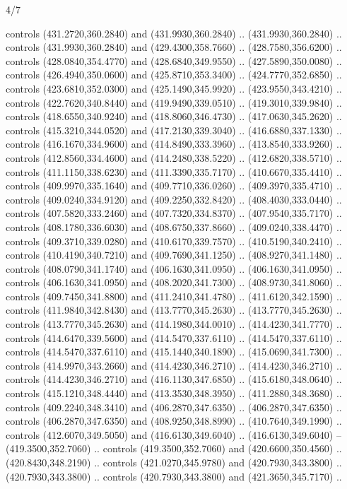 \begin{flagdescription}{4/7}
\begin{scope}[shift={(0.5\flaglength,0.5\flagwidth)},scale=\flagwidth*\stretchfactor/820]
\begin{scope}[scale=1.87,xshift=-138mm,yshift=75mm]
\begin{scope}[y=0.8pt, x=0.8pt, yscale=-1, xscale=1]
\begin{scope}[fill=c9ca168]
  controls (431.2720,360.2840) and (431.9930,360.2840) .. (431.9930,360.2840) ..
  controls (431.9930,360.2840) and (429.4300,358.7660) .. (428.7580,356.6200) ..
  controls (428.0840,354.4770) and (428.6840,349.9550) .. (427.5890,350.0080) ..
  controls (426.4940,350.0600) and (425.8710,353.3400) .. (424.7770,352.6850) ..
  controls (423.6810,352.0300) and (425.1490,345.9920) .. (423.9550,343.4210) ..
  controls (422.7620,340.8440) and (419.9490,339.0510) .. (419.3010,339.9840) ..
  controls (418.6550,340.9240) and (418.8060,346.4730) .. (417.0630,345.2620) ..
  controls (415.3210,344.0520) and (417.2130,339.3040) .. (416.6880,337.1330) ..
  controls (416.1670,334.9600) and (414.8490,333.3960) .. (413.8540,333.9260) ..
  controls (412.8560,334.4600) and (414.2480,338.5220) .. (412.6820,338.5710) ..
  controls (411.1150,338.6230) and (411.3390,335.7170) .. (410.6670,335.4410) ..
  controls (409.9970,335.1640) and (409.7710,336.0260) .. (409.3970,335.4710) ..
  controls (409.0240,334.9120) and (409.2250,332.8420) .. (408.4030,333.0440) ..
  controls (407.5820,333.2460) and (407.7320,334.8370) .. (407.9540,335.7170) ..
  controls (408.1780,336.6030) and (408.6750,337.8660) .. (409.0240,338.4470) ..
  controls (409.3710,339.0280) and (410.6170,339.7570) .. (410.5190,340.2410) ..
  controls (410.4190,340.7210) and (409.7690,341.1250) .. (408.9270,341.1480) ..
  controls (408.0790,341.1740) and (406.1630,341.0950) .. (406.1630,341.0950) ..
  controls (406.1630,341.0950) and (408.2020,341.7300) .. (408.9730,341.8060) ..
  controls (409.7450,341.8800) and (411.2410,341.4780) .. (411.6120,342.1590) ..
  controls (411.9840,342.8430) and (413.7770,345.2630) .. (413.7770,345.2630) ..
  controls (413.7770,345.2630) and (414.1980,344.0010) .. (414.4230,341.7770) ..
  controls (414.6470,339.5600) and (414.5470,337.6110) .. (414.5470,337.6110) ..
  controls (414.5470,337.6110) and (415.1440,340.1890) .. (415.0690,341.7300) ..
  controls (414.9970,343.2660) and (414.4230,346.2710) .. (414.4230,346.2710) ..
  controls (414.4230,346.2710) and (416.1130,347.6850) .. (415.6180,348.0640) ..
  controls (415.1210,348.4440) and (413.3530,348.3950) .. (411.2880,348.3680) ..
  controls (409.2240,348.3410) and (406.2870,347.6350) .. (406.2870,347.6350) ..
  controls (406.2870,347.6350) and (408.9250,348.8990) .. (410.7640,349.1990) ..
  controls (412.6070,349.5050) and (416.6130,349.6040) .. (416.6130,349.6040) --
  (419.3500,352.7060) .. controls (419.3500,352.7060) and (420.6600,350.4560) ..
  (420.8430,348.2190) .. controls (421.0270,345.9780) and (420.7930,343.3800) ..
  (420.7930,343.3800) .. controls (420.7930,343.3800) and (421.3650,345.7170) ..

\end{scope}
\end{scope}
\end{scope}
\end{scope}
\end{flagdescription}
